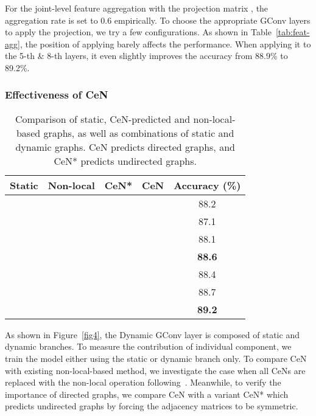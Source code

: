 \documentclass[sigconf]{acmart}
\begin{document}
For the joint-level feature aggregation with the projection matrix , the aggregation rate  is set to 0.6 empirically. To choose the appropriate GConv layers to apply the projection, we try a few configurations. As shown in Table~\ref{tab:feat-agg}, the position of applying  barely affects the performance. When applying it to the 5-th \& 8-th layers, it even slightly improves the accuracy from 88.9\% to 89.2\%.

\subsubsection{Effectiveness of CeN}







\begin{table}[t]
  \caption{Comparison of static, CeN-predicted and non-local-based graphs, as well as combinations of static and dynamic graphs. CeN predicts directed graphs, and CeN* predicts undirected graphs.}
  \label{table1}\begin{tabular}{c|c|c|c|c}
    \toprule
    Static & Non-local & CeN*  & CeN   & Accuracy (\%)  \\
    \midrule
         &       &       &       & 88.2 \\
          &      &       &       & 87.1 \\
          &       &      &       & 88.1 \\
          &       &       &      & \textbf{88.6} \\
    \midrule
         &      &       &       & 88.4 \\
         &       &      &       & 88.7 \\
         &       &       &      & \textbf{89.2} \\
    \bottomrule
    \end{tabular}\end{table}

As shown in Figure~\ref{fig4}, the Dynamic GConv layer is composed of static and dynamic branches. To measure the contribution of individual component, we train the model either using the static or dynamic branch only. To compare CeN with existing non-local-based method, we investigate the case when all CeNs are replaced with the non-local operation following~\cite{shi2019two}. Meanwhile, to verify the importance of directed graphs, we compare CeN with a variant CeN* which predicts undirected graphs by forcing the adjacency matrices to be symmetric.
\end{document}
